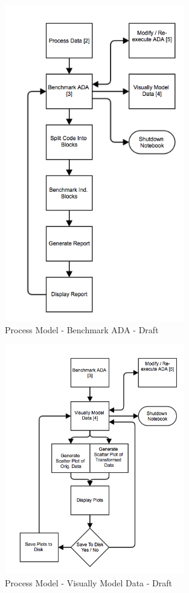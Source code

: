 \documentclass[twoside]{article}
\begin{document}
\begin{figure}[h]
    \centering
	\includegraphics[width=0.7\textwidth]{"images/process_model_benchmark_ada_3_"}
    \caption{Process Model - Benchmark ADA - Draft}
    \label{fig:process_model_benchmark_ada_draft}
\end{figure}

\begin{figure}[h]
    \centering
	\includegraphics[width=0.7\textwidth]{"images/process_model_visually_model_data_4_"}
    \caption{Process Model - Visually Model Data - Draft}
    \label{fig:process_model_visually_model_data_draft}
\end{figure}
\end{document}
